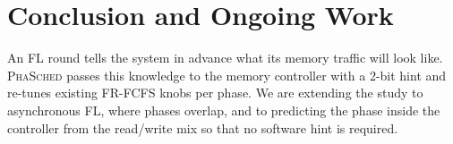 \documentclass[conference]{IEEEtran}
\newcommand{\name}{\textsc{PhaSched}}
\begin{document}
\section{Conclusion and Ongoing Work}
An FL round tells the system in advance what its memory traffic will look like. \name{} passes this knowledge to the memory controller with a 2-bit hint and re-tunes existing FR-FCFS knobs per phase. We are extending the study to asynchronous FL, where phases overlap, and to predicting the phase inside the controller from the read/write mix so that no software hint is required.



\end{document}
